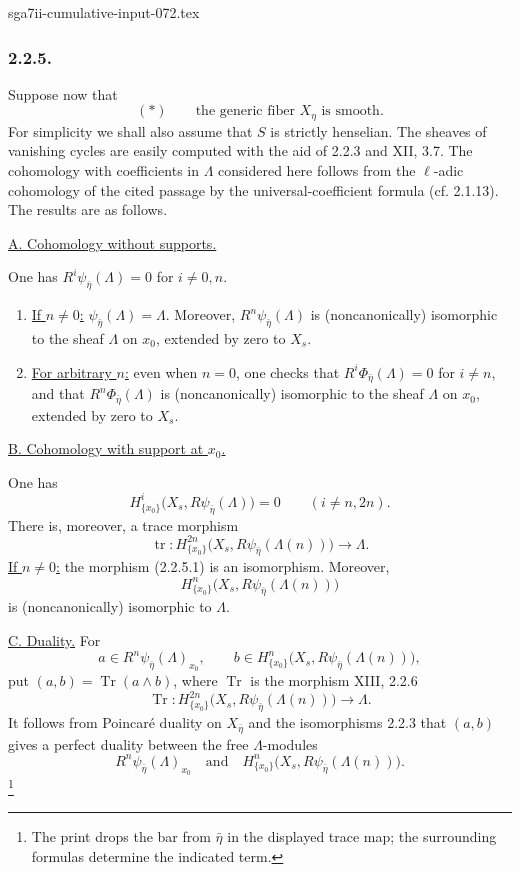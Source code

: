 \begin{filecontents*}{sga7ii-cumulative-input-072.tex}
\subsubsection*{2.2.5.}
Suppose now that
\[
(*)\qquad\text{the generic fiber $X_\eta$ is smooth.}
\]
For simplicity we shall also assume that $S$ is strictly henselian.
The sheaves of vanishing cycles are easily computed with the aid of
2.2.3 and XII, 3.7.  The cohomology with coefficients in $\Lambda$
considered here follows from the $\ell$-adic cohomology of the cited
passage by the universal-coefficient formula (cf. 2.1.13).  The
results are as follows.

\medskip
\noindent\underline{A. Cohomology without supports.}

One has $R^i\psi_{\bar\eta}(\Lambda)=0$ for $i\ne0,n$.

\begin{enumerate}
\item[1)] \underline{If $n\ne0$:}
$\psi_{\bar\eta}(\Lambda)=\Lambda$.  Moreover,
$R^n\psi_{\bar\eta}(\Lambda)$ is (noncanonically) isomorphic to the
sheaf $\Lambda$ on $x_0$, extended by zero to $X_s$.

\item[2)] \underline{For arbitrary $n$:}
even when $n=0$, one checks that
$R^i\Phi_{\bar\eta}(\Lambda)=0$ for $i\ne n$, and that
$R^n\Phi_{\bar\eta}(\Lambda)$ is (noncanonically) isomorphic to the
sheaf $\Lambda$ on $x_0$, extended by zero to $X_s$.
\end{enumerate}

\medskip
\noindent\underline{B. Cohomology with support at $x_0$.}

One has
\[
H^i_{\{x_0\}}\bigl(X_s,R\psi_{\bar\eta}(\Lambda)\bigr)=0
\qquad(i\ne n,2n).
\]
There is, moreover, a trace morphism
\begin{equation}\tag{2.2.5.1}
\operatorname{tr}:
H^{2n}_{\{x_0\}}\bigl(X_s,R\psi_{\bar\eta}(\Lambda(n))\bigr)
\longrightarrow\Lambda.
\end{equation}
\underline{If $n\ne0$:} the morphism (2.2.5.1) is an isomorphism.
Moreover,
\[
H^n_{\{x_0\}}\bigl(X_s,R\psi_{\bar\eta}(\Lambda(n))\bigr)
\]
is (noncanonically) isomorphic to $\Lambda$.

\medskip
\noindent\underline{C. Duality.}
For
\[
a\in R^n\psi_{\bar\eta}(\Lambda)_{x_0},
\qquad
b\in H^n_{\{x_0\}}\bigl(X_s,R\psi_{\bar\eta}(\Lambda(n))\bigr),
\]
put $(a,b)=\operatorname{Tr}(a\wedge b)$, where $\operatorname{Tr}$
is the morphism XIII, 2.2.6
\[
\operatorname{Tr}:
H^{2n}_{\{x_0\}}\bigl(X_s,R\psi_{\bar\eta}(\Lambda(n))\bigr)
\longrightarrow\Lambda.
\]
It follows from Poincar\'e duality on $X_{\bar\eta}$ and the
isomorphisms 2.2.3 that $(a,b)$ gives a perfect duality between the
free $\Lambda$-modules
\[
R^n\psi_{\bar\eta}(\Lambda)_{x_0}
\quad\text{and}\quad
H^n_{\{x_0\}}\bigl(X_s,R\psi_{\bar\eta}(\Lambda(n))\bigr).
\]
\footnote{The print drops the bar from $\bar\eta$ in the displayed
trace map; the surrounding formulas determine the indicated term.}
\end{filecontents*}
